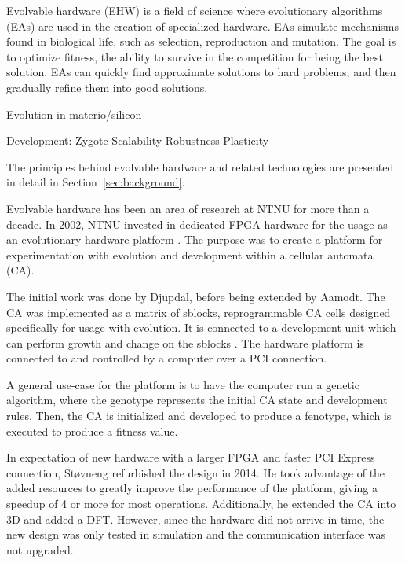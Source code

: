 Evolvable hardware (EHW) is a field of science where evolutionary algorithms (EAs) are used in the creation of specialized hardware.
EAs simulate mechanisms found in biological life, such as selection, reproduction and mutation.
The goal is to optimize fitness, the ability to survive in the competition for being the best solution.
EAs can quickly find approximate solutions to hard problems, and then gradually refine them into good solutions.


Evolution in materio/silicon \cite{miller2014evolution}

Development:
\cite{harding2008artificial} \cite{tufte2008evodevo}
Zygote
Scalability
Robustness
Plasticity

The principles behind evolvable hardware and related technologies are presented in detail in Section~\ref{sec:background}.


Evolvable hardware has been an area of research at NTNU for more than a decade.
In 2002, NTNU invested in dedicated FPGA hardware for the usage as an evolutionary hardware platform .
The purpose was to create a platform for experimentation with evolution and development within a cellular automata (CA).

The initial work was done by Djupdal, before being extended by Aamodt.
The CA was implemented as a matrix of sblocks, reprogrammable CA cells designed specifically for usage with evolution.
It is connected to a development unit which can perform growth and change on the sblocks .
The hardware platform is connected to and controlled by a computer over a PCI connection.

A general use-case for the platform is to have the computer run a genetic algorithm, where the genotype represents the initial CA state and development rules.
Then, the CA is initialized and developed to produce a fenotype, which is executed to produce a fitness value.

In expectation of new hardware with a larger FPGA and faster PCI Express connection, Støvneng refurbished the design in 2014.
He took advantage of the added resources to greatly improve the performance of the platform, giving a speedup of 4 or more for most operations.
Additionally, he extended the CA into 3D and added a DFT.
However, since the hardware did not arrive in time, the new design was only tested in simulation and the communication interface was not upgraded.

